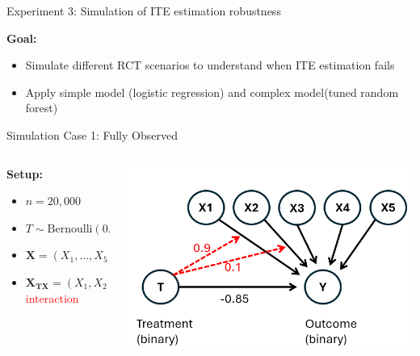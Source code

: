 \documentclass[onlytextwidth,english]{beamer}\usepackage[]{graphicx}\usepackage[]{xcolor}
\begin{document}
\begin{frame}{Experiment 3: Simulation of ITE estimation robustness}

\textbf{Goal:}

\begin{itemize}
    \item Simulate different RCT scenarios to understand when ITE estimation fails
    \item Apply simple model (logistic regression) and complex model(tuned random forest)
\end{itemize}

\end{frame}




\begin{frame}{Simulation Case 1: Fully Observed}

\begin{columns}

\begin{column}{0.52\textwidth}

\vspace{-0.5em}
\textbf{Setup:}
\begin{itemize}\setlength\itemsep{0.4em}
  \item $n = 20{,}000$
  \item $T \sim \text{Bernoulli}(0.5)$
  \item $\mathbf{X} = (X_1, \dots, X_5)^\top \sim \mathcal{N}(\mathbf{0}, \Sigma)$\\
  \item $\mathbf{X_{TX}} = (X_1, X_2)^\top$ \textcolor{red}{interaction}
\end{itemize}


\end{column}

\begin{column}{0.42\textwidth}
    \includegraphics[width=\textwidth]{img/simulation_observed.png}
\end{column}


\end{columns}
\end{frame}
\end{document}
